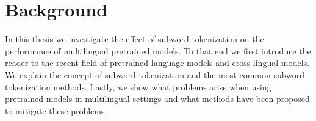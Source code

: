 



\chapter{Background}
\label{chap:background}



In this thesis we investigate the effect of subword tokenization on the performance of multilingual pretrained models. To that end we first introduce the reader to the recent field of pretrained language models and cross-lingual models. We explain the concept of subword tokenization and the most common subword tokenization methods. Lastly, we show what problems arise when using pretrained models in multilingual settings and what methods have been proposed to mitigate these problems.


